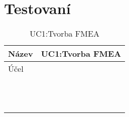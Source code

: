 \chapter{Testovaní}
\label{sec:testovani}
\begin{longtable}{p{4cm} | p{12cm} } 
        \caption{UC1:Tvorba FMEA}
\label{tab:compare}
\\
Název & UC1:Tvorba FMEA \\ \hline
Účel &  \\  \hline
 &  \\ \hline
 &  \\ \hline
 &  \\ \hline
 &  \\ \hline
 &  \\ \hline
 &  \\ \hline
 &  \\ \hline
 &  \\ \hline
 &  \\ \hline
 &  \\ \hline
 &  \\ \hline
 &  \\ \hline
\end{longtable}

